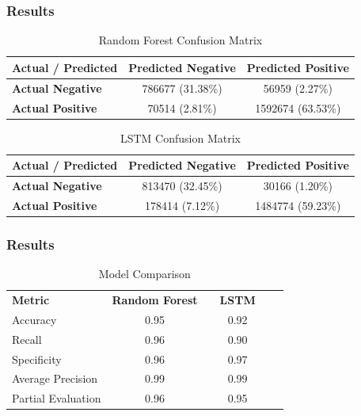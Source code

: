 \documentclass[10pt]{beamer}
\begin{document}
\begin{frame}
    \frametitle{Results}
    \begin{block}{}
        \begin{table}[h]
            \centering
            \caption{Random Forest Confusion Matrix}
            \label{tab:random_forest_confusion_matrix}
            \begin{tabular}{lcc}
                \hline
                \textbf{Actual / Predicted} & \textbf{Predicted Negative} & \textbf{Predicted Positive} \\
                \hline
                \textbf{Actual Negative} & 786677 (31.38\%) & 56959 (2.27\%) \\
                \textbf{Actual Positive} & 70514 (2.81\%) & 1592674 (63.53\%) \\
                \hline
            \end{tabular}
        \end{table}

        \begin{table}[h]
            \centering
            \caption{LSTM Confusion Matrix}
            \label{tab:lstm_confusion_matrix}
            \begin{tabular}{lcc}
                \hline
                \textbf{Actual / Predicted} & \textbf{Predicted Negative} & \textbf{Predicted Positive} \\
                \hline
                \textbf{Actual Negative} & 813470 (32.45\%) & 30166 (1.20\%) \\
                \textbf{Actual Positive} & 178414 (7.12\%) & 1484774 (59.23\%) \\
                \hline
            \end{tabular}
        \end{table}
    \end{block} 
\end{frame}

\begin{frame}
    \frametitle{Results}
    \begin{block}{}
        \begin{table}[h]
            \centering
            \caption{Model Comparison}
            \label{tab:model_comparison}
            \begin{tabular}{lccccc}
                \hline
                \textbf{Metric} & \textbf{Random Forest} & & \textbf{LSTM} & \\
                \cline{2-5}
                Accuracy & 0.95 & & 0.92 & \\
                Recall & 0.96 & & 0.90 & \\
                Specificity & 0.96 & & 0.97 & \\
                Average Precision & 0.99 & & 0.99 & \\
                Partial Evaluation & 0.96 & & 0.95 & \\
                \hline
            \end{tabular}
        \end{table}
    \end{block} 
\end{frame}
\end{document}

